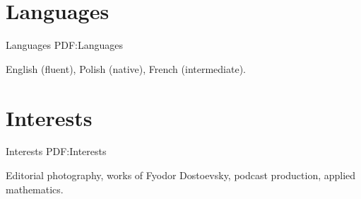 \documentclass[letterpaper,10pt,oneside]{article}
\newcommand{\CVNote}{Resume compiled on {\today}}
\begin{document}
\begin{body}
\begin{comment}


\href{http://commons.trincoll.edu/tripod}
{\textbf{Trinity Tripod}},
Trinity College
\hfill
\DatestampYMD{2017}{08}{01} --
\DatestampYMD{2018}{01}{01}

\GapNoBreak
\BulletItem
Photography Editor
\begin{detail}
\SubBulletItem
Collaborated with Trinity College Student Photographers to provide photographic content for weekly paper.
\SubBulletItem
Delivered hundreds of images for a variety of different stories, including custom stock imagery.
\SubBulletItem
Developed automated system for photo captioning using EXIF data, extracted using Adobe InDesign, resulting in 75\% time decrease when formatting images.
\end{detail}
\end{comment}


\noindent\hrulefill
\section
{Languages}
{Languages}
{PDF:Languages}

English (fluent), Polish (native), French (intermediate).


\section
{Interests}
{Interests}
{PDF:Interests}

Editorial photography, works of Fyodor Dostoevsky, podcast production, applied mathematics.


\begin{comment}
\section
{References}
{References}
{PDF:References}

Available upon request.
\end{comment}
\end{body}


\begin{flushright}
\UseNoteFont
\hspace{2.0mm}\null
\end{flushright}
\end{document}
